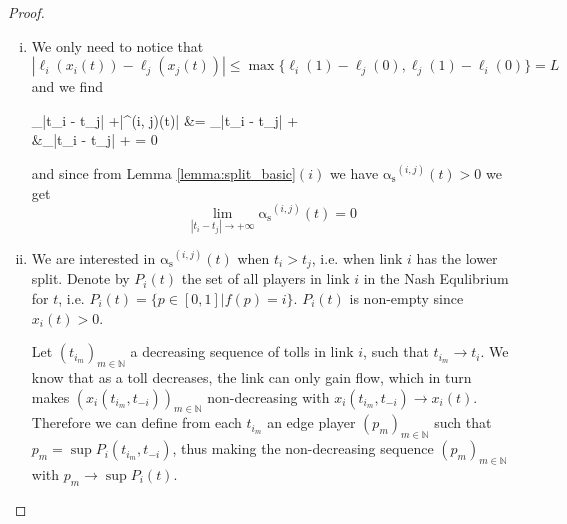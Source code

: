 \documentclass[10pt,a4paper]{book}
\newcommand{\as}{\mathrm{\alpha_s}}
\newcommand{\N}{\mathbb{N}}
\theoremstyle{definition}
\theoremstyle{comment}
\begin{document}
\begin{proof}
	$ $
	\begin{enumerate}[(i)]
		\item We only need to notice that
		\[|\ell_i(x_i(t)) - \ell_j(x_j(t))| \le \max\{\ell_i(1) - \ell_j(0), \ell_j(1) - \ell_i(0)\} = L\]
		and we find
		\begin{flalign*}
			\lim_{|t_i - t_j| \rightarrow +\infty}|\as^{(i, j)}(t)| &= \lim_{|t_i - t_j| \rightarrow +\infty}\\
			&\le \lim_{|t_i - t_j| \rightarrow +\infty} = 0
		\end{flalign*}
		and since from Lemma \ref{lemma:split_basic}$(i)$ we have $\as^{(i, j)}(t) > 0$ we get
		\[\lim_{|t_i - t_j| \rightarrow +\infty}\as^{(i, j)}(t) = 0\]
		\item We are interested in $\as^{(i, j)}(t)$ when $t_i > t_j$, i.e. when link $i$ has the lower split.
		Denote by $P_i(t)$ the set of all players in link $i$ in the Nash Equlibrium for $t$, i.e. $P_i(t) = \{p \in [0, 1] | f(p) = i\}$.
		$P_i(t)$ is non-empty since $x_i(t) > 0$.

		Let $(t_{i_m})_{m \in \N}$ a decreasing sequence of tolls in link $i$, such that $t_{i_m} \rightarrow t_i$.
		We know that as a toll decreases, the link can only gain flow, which in turn makes $(x_i(t_{i_m}, t_{-i}))_{m \in \N}$ non-decreasing with $x_i(t_{i_m}, t_{-i}) \rightarrow x_i(t)$.
		Therefore we can define from each $t_{i_m}$ an edge player $(p_m)_{m \in \N}$ such that $p_m = \sup P_i(t_{i_m}, t_{-i})$, thus making the non-decreasing sequence $(p_m)_{m \in \N}$ with $p_m \rightarrow \sup P_i(t)$.


\end{enumerate}
\end{proof}
\end{document}
